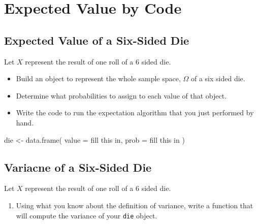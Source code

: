 \documentclass[
]{book}
\newenvironment{Shaded}{\begin{snugshade}}{\end{snugshade}}
\newcommand{\AttributeTok}[1]{\textcolor[rgb]{0.77,0.63,0.00}{#1}}
\newcommand{\FunctionTok}[1]{\textcolor[rgb]{0.00,0.00,0.00}{#1}}
\newcommand{\NormalTok}[1]{#1}
\newcommand{\OtherTok}[1]{\textcolor[rgb]{0.56,0.35,0.01}{#1}}
\newcommand{\StringTok}[1]{\textcolor[rgb]{0.31,0.60,0.02}{#1}}
\providecommand{\tightlist}{%
  \setlength{\itemsep}{0pt}\setlength{\parskip}{0pt}}
\theoremstyle{definition}
\theoremstyle{definition}
\theoremstyle{definition}
\theoremstyle{definition}
\theoremstyle{remark}
\begin{document}
\hypertarget{expected-value-by-code}{%
\section{Expected Value by Code}\label{expected-value-by-code}}

\hypertarget{expected-value-of-a-six-sided-die}{%
\subsection{Expected Value of a Six-Sided Die}\label{expected-value-of-a-six-sided-die}}

Let \(X\) represent the result of one roll of a 6 sided die.

\begin{itemize}
\tightlist
\item
  Build an object to represent the whole sample space, \(\Omega\) of a six sided die.
\item
  Determine what probabilities to assign to each value of that object.
\item
  Write the code to run the expectation algorithm that you just performed by hand.
\end{itemize}

\begin{Shaded}
\begin{Highlighting}[]
\NormalTok{die }\OtherTok{\textless{}{-}} \FunctionTok{data.frame}\NormalTok{(}
    \AttributeTok{value =} \StringTok{\textquotesingle{}fill this in\textquotesingle{}}\NormalTok{,}
    \AttributeTok{prob  =} \StringTok{\textquotesingle{}fill this in\textquotesingle{}}
\NormalTok{  )}
\end{Highlighting}
\end{Shaded}

\hypertarget{variacne-of-a-six-sided-die}{%
\subsection{Variacne of a Six-Sided Die}\label{variacne-of-a-six-sided-die}}

Let \(X\) represent the result of one roll of a 6 sided die.

\begin{enumerate}
\def\labelenumi{\arabic{enumi}.}
\setcounter{enumi}{4}
\tightlist
\item
  Using what you know about the definition of variance, write a function that will compute the variance of your \texttt{die} object.
\end{enumerate}
\end{document}

